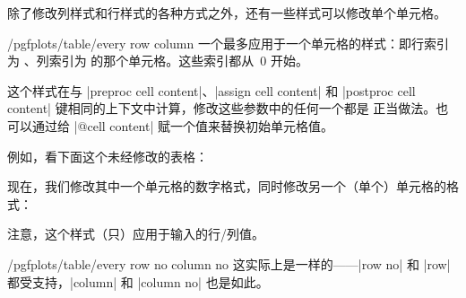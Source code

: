 \documentclass[a4paper,doc2]{ltxdoc}
\begin{document}
除了修改列样式和行样式的各种方式之外，还有一些样式可以修改单个单元格。

\begin{stylekey}{/pgfplots/table/every row  column }
    一个最多应用于一个单元格的样式：即行索引为 、列索引为
     的那个单元格。这些索引都从~$0$ 开始。

    这个样式在与 |preproc cell content|、|assign cell content| 和
    |postproc cell content| 键相同的上下文中计算，修改这些参数中的任何一个都是
    正当做法。也可以通过给 |@cell content| 赋一个值来替换初始单元格值。

    例如，看下面这个未经修改的表格：
\begin{codeexample}[]
\end{codeexample}

    现在，我们修改其中一个单元格的数字格式，同时修改另一个（单个）单元格的格式：
\begin{codeexample}[]
\end{codeexample}
    注意，这个样式（只）应用于输入的行/列值。
\end{stylekey}

\begin{stylekey}{/pgfplots/table/every row no  column no }
    这实际上是一样的——|row no| 和 |row| 都受支持，|column| 和 |column no| 也是如此。
\end{stylekey}
\end{document}
